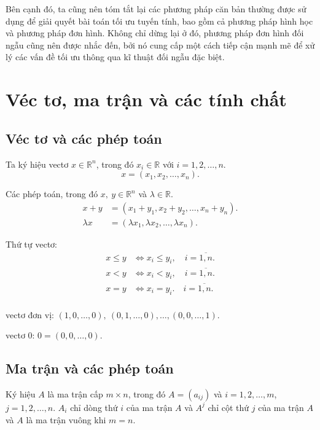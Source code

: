 \documentclass[12pt,a4paper]{report}
\begin{document}
Bên cạnh đó, ta cũng nên tóm tắt lại các phương pháp căn bản thường được sử dụng để giải quyết bài toán tối ưu tuyến tính, bao gồm cả phương pháp hình học và phương pháp đơn hình. Không chỉ dừng lại ở đó, phương pháp đơn hình đối ngẫu cũng nên được nhắc đến, bởi nó cung cấp một cách tiếp cận mạnh mẽ để xử lý các vấn đề tối ưu thông qua kĩ thuật đối ngẫu đặc biệt.

\section{ Véc tơ, ma trận và các tính chất}

\subsection{ Véc tơ và các phép toán }

Ta ký hiệu vectơ $x \in \mathbb{R}^n$, trong đó $x_i \in \mathbb{R}$ với $i=1,2,\ldots,n$.
\begin{equation*}
x=(x_1,x_2,\ldots,x_n).
\end{equation*}
 
Các phép toán, trong đó $x, \: y \in \mathbb{R}^n$ và $\lambda \in \mathbb{R}$.
\begin{equation*}
\begin{split}
x + y &= (x_1 + y_1, x_2 + y_2 , \ldots , x_n +y_n). \\
\lambda x &= (\lambda x_1 , \lambda x_2 , \ldots , \lambda x_n).
\end{split}
\end{equation*}

Thứ tự vectơ:
\begin{equation*}
\begin{split}
x \leq y & \Leftrightarrow x_i \leq y_i, \quad i= \overline{1,n}. \\
x < y & \Leftrightarrow x_i < y_i,  \quad i= \overline{1,n}.\\
x = y & \Leftrightarrow x_i = y_i. \quad i= \overline{1,n}. \\
\end{split}
\end{equation*}

 vectơ đơn vị: $(1,0,\ldots,0),\:(0,1,\ldots,0) , \ldots , (0,0,\ldots,1)$.

 vectơ $0$: $0=(0,0,\ldots,0)$. 

\subsection{ Ma trận và các phép toán}
 Ký hiệu $A$ là ma trận cấp $m\times n$, trong đó $A=(a_{ij})$ và $i=1,2,\ldots,m$, $j=1,2,\ldots,n$. $A_i$ chỉ dòng thứ $i$ của ma trận $A$ và $A^j$ chỉ cột thứ $j$ của ma trận $A$ và $A$ là ma trận vuông khi $m=n$.
\end{document}
